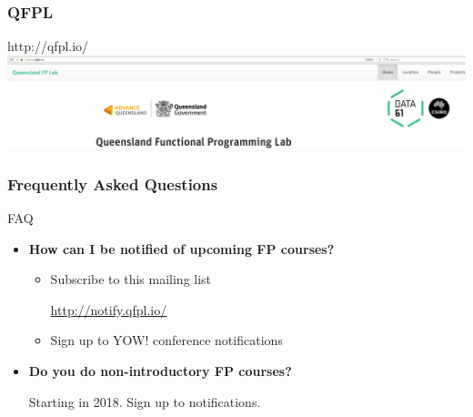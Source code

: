 \begin{frame}
\frametitle{QFPL}
\begin{block}{http://qfpl.io/}
\includegraphics[height=0.24\textheight]{image/qfpl-io.png}
\end{block}
\end{frame}

\begin{frame}
\frametitle{Frequently Asked Questions}
\begin{block}{FAQ}
\begin{itemize}
\item<1-> \textbf{How can I be notified of upcoming FP courses?}
  \begin{itemize}
  \item Subscribe to this mailing list

        \url{http://notify.qfpl.io/}
  \item Sign up to YOW! conference notifications
  \end{itemize}
\item<2-> \textbf{Do you do non-introductory FP courses?}

  Starting in 2018. Sign up to notifications.
\end{itemize}
\end{block}
\end{frame}
